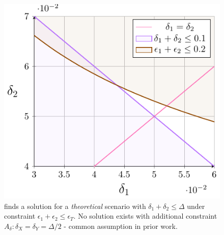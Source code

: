 \begin{figure}
    \centering
    \includegraphics[width=0.75\linewidth]{avoir/images/concrete-example-tikz}
%                
    \caption{\AVOIRmethodname{} finds a solution for a \textit{theoretical} scenario with $\delta_1 + \delta_2 \leq \Delta$ under constraint $\epsilon_1 + \epsilon_2 \leq \epsilon_T$. No solution exists with additional constraint $A_\delta: \delta_X = \delta_Y = \Delta/2$ - common assumption in prior work.}
    \label{fig:theoretical-example}
\end{figure}


